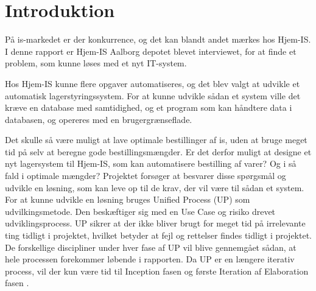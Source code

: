 \chapter{Introduktion}\label{ch:introduction}
På is-markedet er der konkurrence, og det kan blandt andet mærkes hos Hjem-IS. I denne rapport er Hjem-IS Aalborg depotet blevet interviewet, for at finde et problem, som kunne løses med et nyt IT-system.  

Hos Hjem-IS kunne flere opgaver automatiseres, og det blev valgt at udvikle et automatisk lagerstyringssystem. For at kunne udvikle sådan et system ville det kræve en database med samtidighed, og et program som kan håndtere data i databasen, og opereres med en brugergrænseflade. 

Det skulle så være muligt at lave optimale bestillinger af is, uden at bruge meget tid på selv at beregne gode bestillingsmængder. Er det derfor muligt at designe et nyt lagersystem til Hjem-IS, som kan automatisere bestilling af varer? Og i så fald i optimale mængder? 
Projektet forsøger at besvarer disse spørgsmål og udvikle en løsning, som kan leve op til de krav, der vil være til sådan et system. For at kunne udvikle en løsning bruges Unified Process (UP) \cite{UnifiedProcess} som udvilkingsmetode. Den beskæftiger sig med en Use Case og risiko drevet udviklingsprocess. UP sikrer at der ikke bliver brugt for meget tid på irrelevante ting tidligt i projektet, hvilket betyder at fejl og rettelser findes tidligt i projektet. De forskellige discipliner under hver fase af UP vil blive gennemgået sådan, at hele processen forekommer løbende i rapporten. Da UP er en længere iterativ process, vil der kun være tid til Inception fasen og første Iteration af Elaboration fasen \cite{UnifiedProcess}.